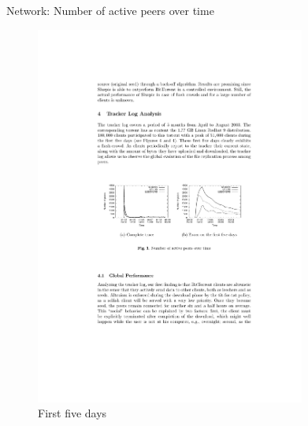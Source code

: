 \begin{frame}{Network: Number of active peers over time}
	
\begin{figure}	
	\includegraphics[width=0.79\textwidth]{bt-fig2}
	\caption{First five days}
\end{figure}	
	
\end{frame}

